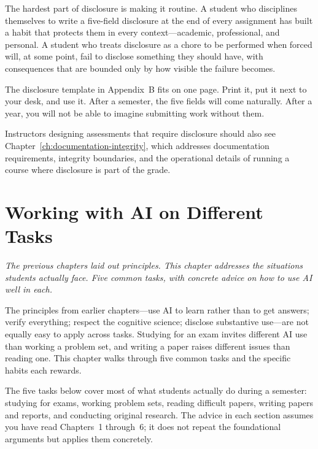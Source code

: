 \documentclass[11pt]{book}
\begin{document}
The hardest part of disclosure is making it routine. A student who disciplines themselves to write a five-field disclosure at the end of every assignment has built a habit that protects them in every context---academic, professional, and personal. A student who treats disclosure as a chore to be performed when forced will, at some point, fail to disclose something they should have, with consequences that are bounded only by how visible the failure becomes.

The disclosure template in Appendix~B fits on one page. Print it, put it next to your desk, and use it. After a semester, the five fields will come naturally. After a year, you will not be able to imagine submitting work without them.

Instructors designing assessments that require disclosure should also see Chapter~\ref{ch:documentation-integrity}, which addresses documentation requirements, integrity boundaries, and the operational details of running a course where disclosure is part of the grade.

\chapter{Working with AI on Different Tasks}
\label{ch:working-with}

\noindent \emph{The previous chapters laid out principles. This chapter addresses the situations students actually face. Five common tasks, with concrete advice on how to use AI well in each.}

\medskip

The principles from earlier chapters---use AI to learn rather than to get answers; verify everything; respect the cognitive science; disclose substantive use---are not equally easy to apply across tasks. Studying for an exam invites different AI use than working a problem set, and writing a paper raises different issues than reading one. This chapter walks through five common tasks and the specific habits each rewards.

The five tasks below cover most of what students actually do during a semester: studying for exams, working problem sets, reading difficult papers, writing papers and reports, and conducting original research. The advice in each section assumes you have read Chapters~1 through~6; it does not repeat the foundational arguments but applies them concretely.
\end{document}
